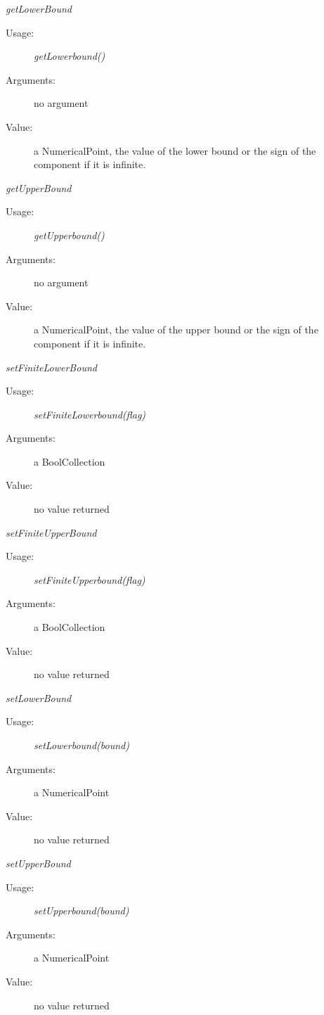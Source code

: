 \begin{description}
\begin{description}
\item \textit{getLowerBound}
\begin{description}
\item[Usage:] \textit{getLowerbound()}
\item[Arguments:] no argument
\item[Value:] a NumericalPoint, the value of the lower bound or the sign of the component if it is infinite.
\end{description}
\bigskip

\item \textit{getUpperBound}
\begin{description}
\item[Usage:] \textit{getUpperbound()}
\item[Arguments:] no argument
\item[Value:] a NumericalPoint, the value of the upper bound or the sign of the component if it is infinite.
\end{description}
\bigskip

\item \textit{setFiniteLowerBound}
\begin{description}
\item[Usage:] \textit{setFiniteLowerbound(flag)}
\item[Arguments:] a BoolCollection
\item[Value:] no value returned
\end{description}
\bigskip

\item \textit{setFiniteUpperBound}
\begin{description}
\item[Usage:] \textit{setFiniteUpperbound(flag)}
\item[Arguments:] a BoolCollection
\item[Value:] no value returned
\end{description}
\bigskip

\item \textit{setLowerBound}
\begin{description}
\item[Usage:] \textit{setLowerbound(bound)}
\item[Arguments:] a NumericalPoint
\item[Value:] no value returned
\end{description}
\bigskip

\item \textit{setUpperBound}
\begin{description}
\item[Usage:] \textit{setUpperbound(bound)}
\item[Arguments:] a NumericalPoint
\item[Value:] no value returned
\end{description}
\bigskip


\end{description}
\end{description}
